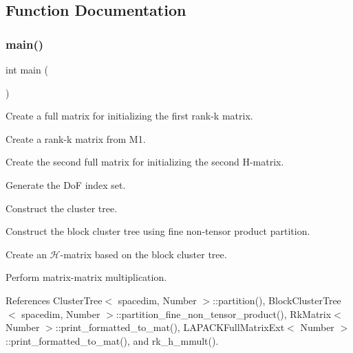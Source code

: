 \subsection{Function Documentation}
\mbox{\label{rkmatrix-hmatrix-mmult_8cc_ae66f6b31b5ad750f1fe042a706a4e3d4}} 
\subsubsection{\texorpdfstring{main()}{main()}}
{\footnotesize\ttfamily int main (\begin{DoxyParamCaption}{ }\end{DoxyParamCaption})}

Create a full matrix for initializing the first rank-\/k matrix.

Create a rank-\/k matrix from {\ttfamily M1}.

Create the second full matrix for initializing the second H-\/matrix.

Generate the DoF index set.

Construct the cluster tree.

Construct the block cluster tree using fine non-\/tensor product partition.

Create an $\mathcal{H}$-\/matrix based on the block cluster tree.

Perform matrix-\/matrix multiplication.

References Cluster\+Tree$<$ spacedim, Number $>$\+::partition(), Block\+Cluster\+Tree$<$ spacedim, Number $>$\+::partition\+\_\+fine\+\_\+non\+\_\+tensor\+\_\+product(), Rk\+Matrix$<$ Number $>$\+::print\+\_\+formatted\+\_\+to\+\_\+mat(), L\+A\+P\+A\+C\+K\+Full\+Matrix\+Ext$<$ Number $>$\+::print\+\_\+formatted\+\_\+to\+\_\+mat(), and rk\+\_\+h\+\_\+mmult().

